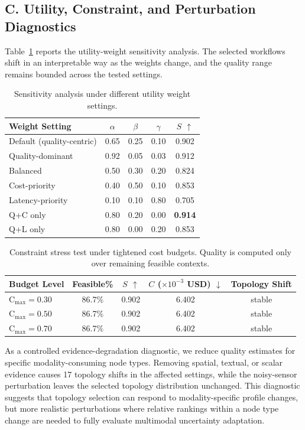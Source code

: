 \documentclass[acmsmall,review,anonymous]{acmart}
\begin{document}
\subsection*{C. Utility, Constraint, and Perturbation Diagnostics}

Table~\ref{tab:sensitivity_simple} reports the utility-weight sensitivity analysis. The selected workflows shift in an interpretable way as the weights change, and the quality range remains bounded across the tested settings.

\begin{table}[h]
\centering
\caption{Sensitivity analysis under different utility weight settings.}
\label{tab:sensitivity_simple}
\small
\begin{tabular}{lcccc}
\toprule
\textbf{Weight Setting} & $\alpha$ & $\beta$ & $\gamma$ & \textbf{$S$ $\uparrow$} \\
\midrule
Default (quality-centric) & 0.65 & 0.25 & 0.10 & 0.902 \\
Quality-dominant         & 0.92 & 0.05 & 0.03 & 0.912 \\
Balanced                 & 0.50 & 0.30 & 0.20 & 0.824 \\
Cost-priority             & 0.40 & 0.50 & 0.10 & 0.853 \\
Latency-priority          & 0.10 & 0.10 & 0.80 & 0.705 \\
Q+C only                  & 0.80 & 0.20 & 0.00 & \textbf{0.914} \\
Q+L only                  & 0.80 & 0.00 & 0.20 & 0.853 \\
\bottomrule
\end{tabular}
\end{table}

\begin{table}[h]
\centering
\caption{Constraint stress test under tightened cost budgets. Quality is computed only over remaining feasible contexts.}
\label{tab:constraint_stress}
\small
\begin{tabular}{lcccc}
\toprule
\textbf{Budget Level} & \textbf{Feasible\%} & \textbf{$S$ $\uparrow$} & \textbf{$C$ ($\times 10^{-3}$ USD) $\downarrow$} & \textbf{Topology Shift} \\
\midrule
C$_{\max}=0.30$ & 86.7\% & 0.902 & 6.402 & stable \\
C$_{\max}=0.50$ & 86.7\% & 0.902 & 6.402 & stable \\
C$_{\max}=0.70$ & 86.7\% & 0.902 & 6.402 & stable \\
\bottomrule
\end{tabular}
\end{table}

As a controlled evidence-degradation diagnostic, we reduce quality estimates for specific modality-consuming node types. Removing spatial, textual, or scalar evidence causes 17 topology shifts in the affected settings, while the noisy-sensor perturbation leaves the selected topology distribution unchanged. This diagnostic suggests that topology selection can respond to modality-specific profile changes, but more realistic perturbations where relative rankings within a node type change are needed to fully evaluate multimodal uncertainty adaptation.
\end{document}
